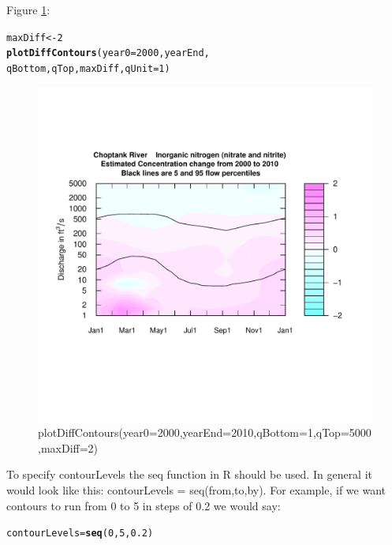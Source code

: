 \documentclass[a4paper,11pt]{article}\usepackage{graphicx, color}
\makeatletter
\newcommand{\hlfunctioncall}[1]{\textcolor[rgb]{0.501960784313725,0,0.329411764705882}{\textbf{#1}}}%
\newenvironment{kframe}{%
 \def\at@end@of@kframe{}%
 \ifinner\ifhmode%
  \def\at@end@of@kframe{\end{minipage}}%
  \begin{minipage}{\columnwidth}%
 \fi\fi%
 \def\FrameCommand##1{\hskip\@totalleftmargin \hskip-\fboxsep
 \colorbox{shadecolor}{##1}\hskip-\fboxsep
     \hskip-\linewidth \hskip-\@totalleftmargin \hskip\columnwidth}%
 \MakeFramed {\advance\hsize-\width
   \@totalleftmargin\z@ \linewidth\hsize
   \@setminipage}}%
 {\par\unskip\endMakeFramed%
 \at@end@of@kframe}
\newenvironment{knitrout}{}{} %
\makeatother
\begin{document}
Figure \ref{fig:plotDiffContours}:
\begin{knitrout}
\color{fgcolor}\begin{kframe}
\begin{alltt}
maxDiff<-2
\hlfunctioncall{plotDiffContours}(year0=2000,yearEnd,
                 qBottom,qTop,maxDiff,qUnit=1)
\end{alltt}
\end{kframe}\begin{figure}[]

\includegraphics[width=1\linewidth,height=1\linewidth]{figure/plotDiffContours} \caption[plotDiffContours(year0=2000,yearEnd=2010,qBottom=1,qTop=5000,maxDiff=2)]{plotDiffContours(year0=2000,yearEnd=2010,qBottom=1,qTop=5000,maxDiff=2)\label{fig:plotDiffContours}}
\end{figure}


\end{knitrout}



To specify contourLevels the seq function in R should be used.  In general it would look like this: contourLevels = seq(from,to,by).  For example, if we want contours to run from 0 to 5 in steps of 0.2 we would say:  

\begin{knitrout}
\color{fgcolor}\begin{kframe}
\begin{alltt}
contourLevels = \hlfunctioncall{seq}(0,5,0.2)
\end{alltt}
\end{kframe}
\end{knitrout}
\end{document}
